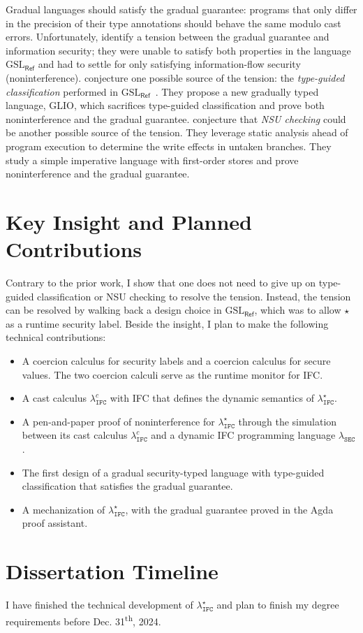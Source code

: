 \documentclass[10pt, letterpaper]{article}
\newcommand{\key}[1]{\ensuremath{\mathtt{#1}}}
\newcommand{\Surface}{\ensuremath{\lambda_{\mathtt{IFC}}^\star}\xspace}
\newcommand{\CC}{\ensuremath{\lambda_{\mathtt{IFC}}^{c}}\xspace}
\newcommand{\DynIFC}{\ensuremath{\lambda_{\mathtt{SEC}}}\xspace}
\newcommand{\GSLRef}{\ensuremath{\mathrm{GSL}_\mathsf{Ref}}\xspace}
\newcommand{\unk}{\key{\star}\xspace}
\begin{document}
Gradual languages should satisfy the gradual guarantee: programs that only
differ in the precision of their type annotations should behave the same modulo
cast errors. Unfortunately, \citet{Toro:2018aa} identify a tension between the
gradual guarantee and information security; they were unable to satisfy both
properties in the language \GSLRef and had to settle for only satisfying
information-flow security (noninterference). \citet{Amorim:2020aa} conjecture
one possible source of the tension: the \textit{type-guided classification}
performed in \GSLRef~\citep{Toro:2018aa}. They propose a new gradually typed language,
GLIO, which sacrifices type-guided classification and prove both noninterference and
the gradual guarantee. \citet{bichhawat2021gradual} conjecture that \textit{NSU checking}
could be another possible source of the tension.
They leverage static analysis ahead of program execution to determine
the write effects in untaken branches. They study a
simple imperative language with first-order stores and prove
noninterference and the gradual guarantee.

\section{Key Insight and Planned Contributions}

Contrary to the prior work, I show that one does not need
to give up on type-guided classification or NSU checking to resolve the tension.
Instead, the tension can be resolved by walking back a design choice in \GSLRef,
which was to allow \unk as a runtime security label.
Beside the insight, I plan to make the following technical contributions:

\begin{itemize}
\item A coercion calculus for security labels and a coercion calculus for secure values.
  The two coercion calculi serve as the runtime monitor for IFC.
\item A cast calculus \CC with IFC that defines the dynamic semantics of \Surface.
\item A pen-and-paper proof of noninterference for \Surface through the simulation
  between its cast calculus \CC and a dynamic IFC programming language \DynIFC.
\item The first design of a gradual security-typed language with type-guided classification
  that satisfies the gradual guarantee.
\item A mechanization of \Surface, with the gradual guarantee proved in the Agda
  proof assistant.
\end{itemize}

\section{Dissertation Timeline}

I have finished the technical development of \Surface and plan to finish my degree requirements
before Dec. 31\textsuperscript{th}, 2024.

\clearpage


\end{document}
